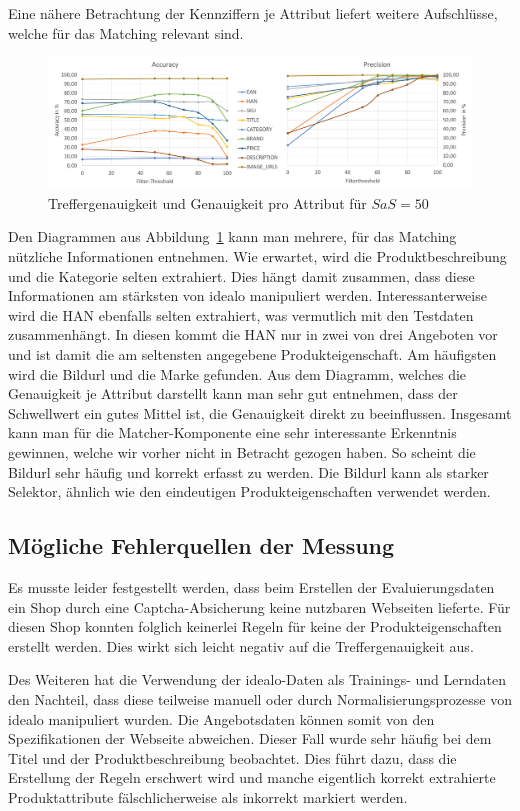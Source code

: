 Eine nähere Betrachtung der Kennziffern je Attribut liefert weitere Aufschlüsse, welche für das Matching relevant sind.

\begin{figure}[H]
    \centering
    \includegraphics[width=\textwidth]{resources/accuracy-and-precision-per-attribute.PNG}
    \caption{Treffergenauigkeit und Genauigkeit pro Attribut für $SaS=50$}
    \label{abb:testdaten}
\end{figure}

Den Diagrammen aus Abbildung~\ref{abb:testdaten} kann man mehrere, für das Matching nützliche Informationen entnehmen.
Wie erwartet, wird die Produktbeschreibung und die Kategorie selten extrahiert.
Dies hängt damit zusammen, dass diese Informationen am stärksten von idealo manipuliert werden.
Interessanterweise wird die HAN ebenfalls selten extrahiert, was vermutlich mit den Testdaten zusammenhängt.
In diesen kommt die HAN nur in zwei von drei Angeboten vor und ist damit die am seltensten angegebene
Produkteigenschaft.
Am häufigsten wird die Bildurl und die Marke gefunden.
Aus dem Diagramm, welches die Genauigkeit je Attribut darstellt kann man sehr gut entnehmen, dass der Schwellwert ein
gutes Mittel ist, die Genauigkeit direkt zu beeinflussen.
Insgesamt kann man für die Matcher-Komponente eine sehr interessante Erkenntnis gewinnen, welche wir vorher nicht in
Betracht gezogen haben.
So scheint die Bildurl sehr häufig und korrekt erfasst zu werden.
Die Bildurl kann als starker Selektor, ähnlich wie den eindeutigen Produkteigenschaften verwendet werden.

\subsection{Mögliche Fehlerquellen der Messung}
\label{subsec:fehlerquellen}

Es musste leider festgestellt werden, dass beim Erstellen der Evaluierungsdaten ein Shop durch eine
Captcha-Absicherung keine nutzbaren Webseiten lieferte.
Für diesen Shop konnten folglich keinerlei Regeln für keine der Produkteigenschaften erstellt werden.
Dies wirkt sich leicht negativ auf die Treffergenauigkeit aus.

Des Weiteren hat die Verwendung der idealo-Daten als Trainings- und Lerndaten den Nachteil, dass diese teilweise
manuell oder durch Normalisierungsprozesse von idealo manipuliert wurden.
Die Angebotsdaten können somit von den Spezifikationen der Webseite abweichen.
Dieser Fall wurde sehr häufig bei dem Titel und der Produktbeschreibung beobachtet.
Dies führt dazu, dass die Erstellung der Regeln erschwert wird und manche eigentlich korrekt extrahierte
Produktattribute fälschlicherweise als inkorrekt markiert werden.